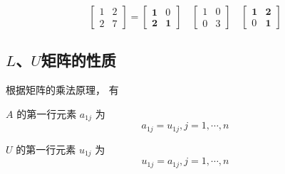 \begin{example}
    \begin{equation} \left[\begin{array}{ll}1 & 2 \\ 2 & 7\end{array}\right]=\left[\begin{array}{ll}\mathbf{1} & 0 \\ \mathbf{2} & \mathbf{1}\end{array}\right] \quad\left[\begin{array}{ll}1 & 0 \\ 0 & 3\end{array}\right] \quad\left[\begin{array}{ll}\mathbf{1} & \mathbf{2} \\ 0 & \mathbf{1}\end{array}\right] \end{equation}
\end{example}


\subsection{$L$、$U$矩阵的性质}

根据矩阵的乘法原理， 有

\begin{theorem}
    $ A $ 的第一行元素 $ a_{1 j} $ 为
    \begin{equation}
        a_{1 j}=u_{1 j}, j=1, \cdots, n
    \end{equation}
\end{theorem}

\begin{corollary}
    $ U $ 的第一行元素 $ u_{1 j} $ 为
    \begin{equation}
        u_{1 j}=a_{1 j}, j=1, \cdots, n
    \end{equation}
\end{corollary}

